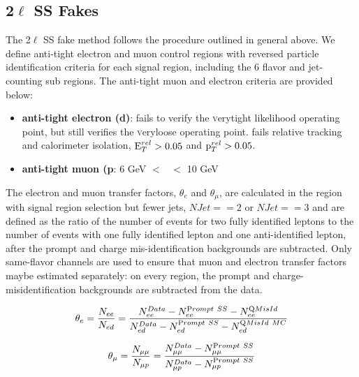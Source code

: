 \subsection{2$\ell$ SS Fakes}
The 2$\ell$ SS fake method follows the procedure outlined in general above. We define anti-tight electron and muon control regions with reversed particle identification criteria for each signal region, including the 6 flavor and jet-counting sub regions. The anti-tight muon and electron criteria are provided below:
  
\begin{itemize}

\item {\bf anti-tight electron (d)}: fails to verify the {\textsc verytight} likelihood operating point, but still verifies the {\textsc veryloose} operating point. fails relative tracking and calorimeter isolation, $\rm E_{T}^{rel}>0.05$ and $\rm p_{T}^{rel}>0.05$.

\item {\bf anti-tight muon (p}: 6 GeV $<$ \pt\ $<$ 10 GeV

\end{itemize}

The electron and muon transfer factors, $\theta_e$ and $\theta_{\mu}$, are calculated in the region with signal region selection but fewer jets, $NJet == 2$ or $NJet ==3$ and are defined as the ratio of the number of events for two fully identified leptons to the number of events with one fully identified lepton and one anti-identified lepton, after the prompt and charge mis-identification backgrounds are subtracted. Only same-flavor channels are used to ensure that muon and electron transfer factors maybe estimated separately:
on every region, the prompt and charge-misidentification backgrounds are subtracted from the data. 

 \begin{equation}
 \theta_{e} = \frac{N_{ee}}{N_{ed}}= \frac{  N^{Data}_{ee} - N^{\rm
 Prompt~SS}_{ee} - N^{\rm QMisId}_{ee} }{ N_{ed}^{Data} - N^{\rm
 Prompt~SS}_{ed} - N^{\rm QMisId~MC}_{ed} } 
\end{equation}
\label{equation:ss_def_thee}


 \begin{equation}
 \theta_{\mu} = \frac{N_{\mu\mu}}{N_{\mu p}}= \frac{ N_{\mu\mu}^{Data} - N^{\rm
 Prompt~SS}_{\mu\mu}}{ N_{\mu p}^{Data} - N^{\rm
 Prompt~SS}_{\mu p} } 
\end{equation}
\label{equation:ss_def_thmm}

